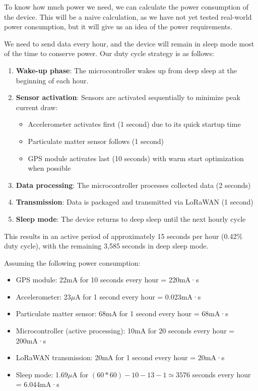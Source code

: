 To know how much power we need, we can calculate the power consumption of the device. This will be a naive calculation, as we have not yet tested real-world power consumption, but it will give us an idea of the power requirements.

We need to send data every hour, and the device will remain in sleep mode most of the time to conserve power. Our duty cycle strategy is as follows:

\begin{enumerate}
  \item \textbf{Wake-up phase}: The microcontroller wakes up from deep sleep at the beginning of each hour.
  \item \textbf{Sensor activation}: Sensors are activated sequentially to minimize peak current draw:
  \begin{itemize}
    \item Accelerometer activates first (1 second) due to its quick startup time
    \item Particulate matter sensor follows (1 second) 
    \item GPS module activates last (10 seconds) with warm start optimization when possible
  \end{itemize}
  \item \textbf{Data processing}: The microcontroller processes collected data (2 seconds)
  \item \textbf{Transmission}: Data is packaged and transmitted via LoRaWAN (1 second)
  \item \textbf{Sleep mode}: The device returns to deep sleep until the next hourly cycle
\end{enumerate}

This results in an active period of approximately 15 seconds per hour (0.42\% duty cycle), with the remaining 3,585 seconds in deep sleep mode.

Assuming the following power consumption:
\begin{itemize}
  \item GPS module: 22mA for 10 seconds every hour = 220mA·s
  \item Accelerometer: 23$\mu$A for 1 second every hour = 0.023mA·s
  \item Particulate matter sensor: 68mA for 1 second every hour = 68mA·s
  \item Microcontroller (active processing): 10mA for 20 seconds every hour = 200mA·s
  \item LoRaWAN transmission: 20mA for 1 second every hour = 20mA·s
  \item Sleep mode: 1.69$\mu$A for $(60*60) - 10 - 13 - 1 \simeq 3576$ seconds every hour = 6.044mA·s
\end{itemize}

